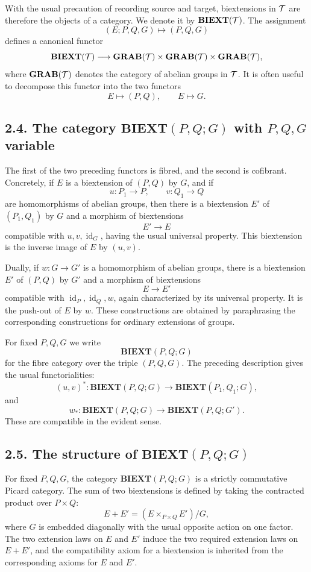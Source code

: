 \documentclass[11pt]{article}
\theoremstyle{plain}
\theoremstyle{definition}
\theoremstyle{remark}
\DeclareMathOperator{\id}{id}
\newcommand{\BIEXT}{\mathbf{BIEXT}}\newcommand{\GRAB}{\mathbf{GRAB}}
\begin{document}
With the usual precaution of recording source and target, biextensions in
\(\mathcal T\) are therefore the objects of a category. We denote it by
\(\BIEXT(\cT)\). The assignment
\[
(E;P,Q,G)\longmapsto (P,Q,G)
\]
defines a canonical functor
\[
\BIEXT(\cT)\longrightarrow
\GRAB(\cT)\times\GRAB(\cT)\times\GRAB(\cT),
\]
where \(\GRAB(\cT)\) denotes the category of abelian groups in \(\mathcal T\). It is
often useful to decompose this functor into the two functors
\[
E\longmapsto (P,Q),\qquad E\longmapsto G.
\]

\subsection*{2.4. The category \(\BIEXT(P,Q;G)\) with \(P,Q,G\) variable}

The first of the two preceding functors is fibred, and the second is cofibrant.
Concretely, if \(E\) is a biextension of \((P,Q)\) by \(G\), and if
\[
u:P_1\to P,\qquad v:Q_1\to Q
\]
are homomorphisms of abelian groups, then there is a biextension \(E'\) of
\((P_1,Q_1)\) by \(G\) and a morphism of biextensions
\[
E'\longrightarrow E
\]
compatible with \(u,v,\id_G\), having the usual universal property. This
biextension is the inverse image of \(E\) by \((u,v)\).

Dually, if \(w:G\to G'\) is a homomorphism of abelian groups, there is a
biextension \(E'\) of \((P,Q)\) by \(G'\) and a morphism of biextensions
\[
E\longrightarrow E'
\]
compatible with \(\id_P,\id_Q,w\), again characterized by its universal property.
It is the push-out of \(E\) by \(w\). These constructions are obtained by
paraphrasing the corresponding constructions for ordinary extensions of groups.

For fixed \(P,Q,G\) we write
\[
\BIEXT(P,Q;G)
\]
for the fibre category over the triple \((P,Q,G)\). The preceding description
gives the usual functorialities:
\[
(u,v)^*:\BIEXT(P,Q;G)\to \BIEXT(P_1,Q_1;G),
\]
and
\[
w_*:\BIEXT(P,Q;G)\to \BIEXT(P,Q;G').
\]
These are compatible in the evident sense.

\subsection*{2.5. The structure of \(\BIEXT(P,Q;G)\)}

For fixed \(P,Q,G\), the category \(\BIEXT(P,Q;G)\) is a strictly commutative
Picard category. The sum of two biextensions is defined by taking the contracted
product over \(P\times Q\):
\[
E+E'=(E\times_{P\times Q}E')/G,
\]
where \(G\) is embedded diagonally with the usual opposite action on one factor.
The two extension laws on \(E\) and \(E'\) induce the two required extension laws
on \(E+E'\), and the compatibility axiom for a biextension is inherited from the
corresponding axioms for \(E\) and \(E'\).
\end{document}
